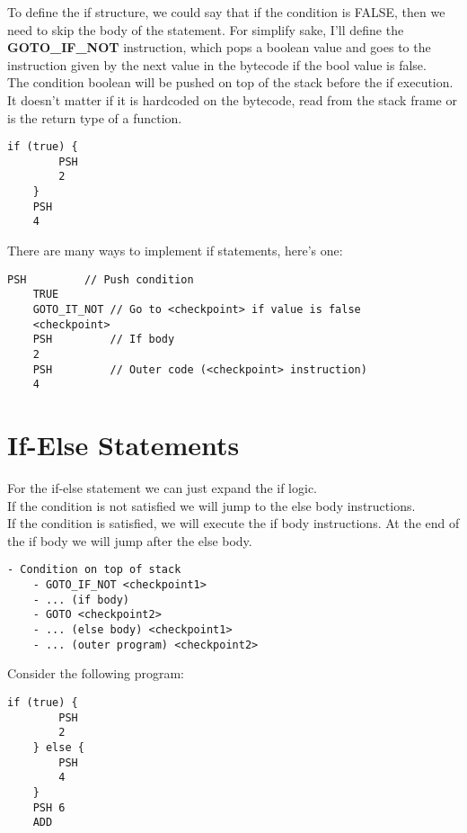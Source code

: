 \documentclass{article}
\begin{document}
To define the if structure, we could say that if the condition is FALSE, then we need to skip the body of the statement.
For simplify sake, I'll define the \textbf{GOTO\_IF\_NOT} instruction, which pops a boolean value and goes to the instruction
given by the next value in the bytecode if the bool value is false.
\\
The condition boolean will be pushed on top of the stack before the if execution. It doesn't matter if it is
hardcoded on the bytecode, read from the stack frame or is the return type of a function.

\begin{lstlisting}[style=generic]
    if (true) {
        PSH
        2
    }
    PSH
    4
\end{lstlisting}

There are many ways to implement if statements, here's one:

\begin{lstlisting}[style=generic]
    PSH         // Push condition
    TRUE
    GOTO_IT_NOT // Go to <checkpoint> if value is false
    <checkpoint>
    PSH         // If body
    2
    PSH         // Outer code (<checkpoint> instruction)
    4
\end{lstlisting}

\pagebreak

\section{If-Else Statements}

For the if-else statement we can just expand the if logic.
\\
If the condition is not satisfied we will jump to the else body instructions.
\\
If the condition is satisfied, we will execute the if body instructions. At the end of the if body
we will jump after the else body.

\begin{lstlisting}[style=generic]
    - Condition on top of stack
    - GOTO_IF_NOT <checkpoint1>
    - ... (if body)
    - GOTO <checkpoint2>
    - ... (else body) <checkpoint1>
    - ... (outer program) <checkpoint2>
\end{lstlisting}

Consider the following program:

\begin{lstlisting}[style=generic]
    if (true) {
        PSH
        2
    } else {
        PSH
        4
    }
    PSH 6
    ADD
\end{lstlisting}
\end{document}
